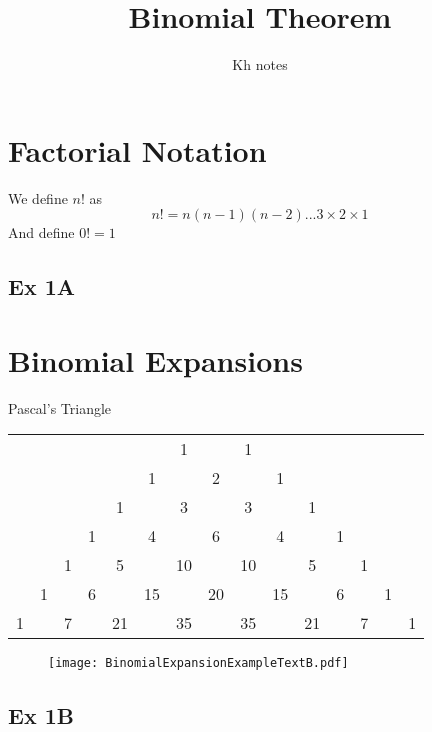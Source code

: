 \documentclass[12pt]{article}
\title{Binomial Theorem}
\author{Kh notes}
\date{}
\begin{document}
	\maketitle
	\tableofcontents
	\newpage
\section{Factorial Notation}
We define $n!$ as
$$n! = n(n-1)(n-2)...3\times 2 \times 1$$
And define $0! = 1$
\subsection{Ex 1A}
\newpage
\section{Binomial Expansions}
\def\arraystretch{2}
\setlength\tabcolsep{0.2cm}
\begin{center}
	Pascal's Triangle\vspace{1cm}\\
	\begin{tabular}{*{15}{c}}
		&&&&&&1&&1&&&&&& \\
		&&&&&1&&2&&1&&&&& \\
		&&&&1&&3&&3&&1&&&& \\
		&&&1&&4&&6&&4&&1&&& \\
		&&1&&5&&10&&10&&5&&1&& \\
		&1&&6&&15&&20&&15&&6&&1& \\
		1&& 7&&21 &&35 &&35 &&21 &&7 && 1 \\
	\end{tabular}\vspace{1cm}
\end{center}
	\begin{figure}[!h]
		\centering
	\texttt{[image: BinomialExpansionExampleTextB.pdf]}
\end{figure}
\newpage
\subsection{Ex 1B}
\newpage
 
\newpage
\end{document}
